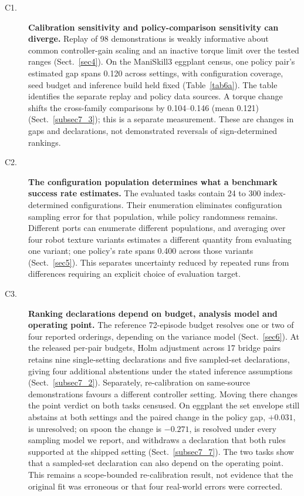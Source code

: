 \documentclass[pdflatex,iicol,sn-apa]{sn-jnl}
\theoremstyle{remark}
\begin{document}
\begin{description}
\item[C1.] \textbf{Calibration sensitivity and policy-comparison sensitivity can diverge.}
Replay of 98 demonstrations is weakly informative about common controller-gain scaling and an
inactive torque limit over the tested ranges (Sect.~\ref{sec4}). On the ManiSkill3 eggplant census,
one policy pair's estimated gap spans 0.120 across settings, with configuration coverage, seed
budget and inference build held fixed (Table~\ref{tab6a}). The table identifies the separate replay
and policy data sources. A torque change shifts the cross-family comparisons by 0.104--0.146
(mean 0.121)
(Sect.~\ref{subsec7_3}); this is a separate measurement. These are changes in gaps and declarations,
not demonstrated reversals of sign-determined rankings.
\item[C2.] \textbf{The configuration population determines what a benchmark success rate estimates.}
The evaluated tasks contain 24 to 300 index-determined configurations. Their enumeration eliminates
configuration sampling error for that population, while policy randomness remains. Different ports
can enumerate different populations, and averaging over four robot texture variants estimates a
different quantity from evaluating one variant; one policy's rate spans 0.400 across those variants
(Sect.~\ref{sec5}). This separates uncertainty reduced by repeated runs from differences requiring
an explicit choice of evaluation target.
\item[C3.] \textbf{Ranking declarations depend on budget, analysis model and operating point.}
The reference 72-episode budget resolves one or two of four reported orderings, depending on the
variance model (Sect.~\ref{sec6}). At the released per-pair budgets, Holm adjustment across 17 bridge
pairs retains nine single-setting declarations and five sampled-set declarations, giving four
additional abstentions under the stated inference assumptions (Sect.~\ref{subsec7_2}). Separately,
re-calibration on same-source demonstrations favours a different controller setting. Moving there
changes the point verdict on both tasks censused. On eggplant the set envelope still abstains at
both settings and the paired change in the policy gap, $+0.031$, is unresolved; on spoon the change
is $-0.271$, is resolved under every sampling model we report, and withdraws a declaration that both
rules supported at the shipped setting (Sect.~\ref{subsec7_7}). The two tasks show that a sampled-set
declaration can also depend on the operating point. This remains
a scope-bounded re-calibration result, not evidence that the original fit was erroneous or that four
real-world errors were corrected.
\end{description}
\end{document}
